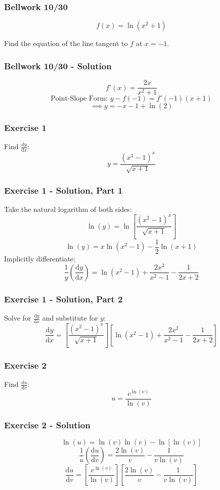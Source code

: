 \documentclass[12pt]{beamer}
\begin{document}
\begin{frame}
	\frametitle{Bellwork 10/30}
	\initclock

	\vfill
	\vfill
	\vfill
	\vfill
	\Large
	\[f(x)=\ln\left(x^{2}+1\right)\]
	\vfill
	\large
	\begin{center}
		Find the equation of the line tangent to $f$ at $x=-1$.
	\end{center}
	\vfill
	\vfill
	\vfill
	\vfill
	\vfill
	\vfill
	\vfill

	\small
	\crono
\end{frame}
\begin{frame}
	\frametitle{Bellwork 10/30 - Solution}

	\vfill
	\vfill
	\vfill
	\Large
	\[f'(x)=\frac{2x}{x^2+1}\]
	\vfill
	\large
	\[\text{Point-Slope Form: }y-f(-1)=f'(-1)(x+1)\]
	\[\implies \boxed{y=-x-1+\ln(2)}\]
	\vfill
	\vfill
	\vfill
\end{frame}
\begin{frame}
	\frametitle{Exercise 1}

	\LARGE
	Find $\frac{\mathrm{d}y}{\mathrm{d}x}$:
	\[y=\frac{(x^2-1)^x}{\sqrt{x+1}}\]
\end{frame}
\begin{frame}
	\frametitle{Exercise 1 - Solution, Part 1}

	\large
	Take the natural logarithm of both sides:
	\[\ln(y)=\ln\left[\frac{(x^2-1)^x}{\sqrt{x+1}}\right]\]
	\[\ln(y)=x\ln(x^2-1)-\frac{1}{2}\ln(x+1)\]
	Implicitly differentiate:
	\[\frac{1}{y}\left(\frac{\mathrm{d}y}{\mathrm{d}x}\right)=\ln(x^2-1)+\frac{2x^2}{x^2-1}-\frac{1}{2x+2}\]
\end{frame}
\begin{frame}
	\frametitle{Exercise 1 - Solution, Part 2}

	\large
	Solve for $\frac{\mathrm{d}y}{\mathrm{d}x}$ and substitute for $y$:
	\[\boxed{\frac{\mathrm{d}y}{\mathrm{d}x}=\left[\frac{(x^2-1)^x}{\sqrt{x+1}}\right]\left[\ln(x^2-1)+\frac{2x^2}{x^2-1}-\frac{1}{2x+2}\right]}\]
\end{frame}
\begin{frame}
	\frametitle{Exercise 2}

	\LARGE
	Find $\frac{\mathrm{d}u}{\mathrm{d}v}$:
	\[u=\frac{v^{\ln(v)}}{\ln(v)}\]
\end{frame}
\begin{frame}
	\frametitle{Exercise 2 - Solution}

	\Large
	\[\ln(u)=\ln(v)\ln(v)-\ln[\ln(v)]\]
	\[\frac{1}{u}\left(\frac{\mathrm{d}u}{\mathrm{d}v}\right)=\frac{2\ln(v)}{v}-\frac{1}{v\ln(v)}\]
	\[\boxed{\frac{\mathrm{d}u}{\mathrm{d}v}=\left[\frac{v^{\ln(v)}}{\ln(v)}\right]\left[\frac{2\ln(v)}{v}-\frac{1}{v\ln(v)}\right]}\]
\end{frame}
\end{document}

